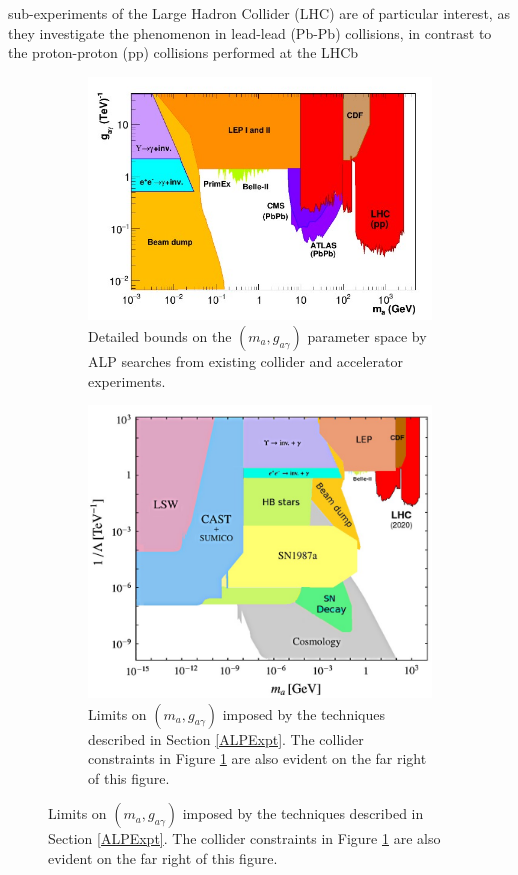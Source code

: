 sub-experiments of the Large Hadron Collider (LHC) are of particular interest, as they investigate the phenomenon in lead-lead (Pb-Pb) collisions, in contrast to the proton-proton (pp) collisions performed at the LHCb \cite{d'Enterria:2753504}
\begin{figure}[H]
    \begin{subfigure}{0.5\textwidth}
    \includegraphics[scale = 0.7]{ALPColliderConstraints.jpg}
    \caption{Detailed bounds on the $(m_{a}, g_{a\gamma})$ parameter space by ALP searches from existing collider and accelerator experiments.}
    \label{ALPColliderConstraints}
    \end{subfigure}
    \hfill
    \begin{subfigure}{0.4\textwidth}
        \includegraphics[scale = 0.35]{ALPExperimentalAndColliderConstraints.jpg}
        \caption{Limits on $(m_{a},g_{a\gamma})$ imposed by the techniques described in Section \ref{ALPExpt}. The collider constraints in Figure \ref{ALPColliderConstraints} are also evident on the far right of this figure.}
        \label{ALPExperimentalAndColliderConstraints}
    \end{subfigure}
    \hfill
\end{figure}
